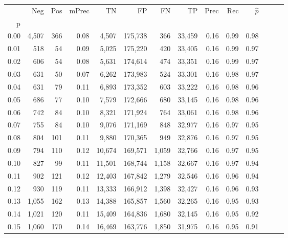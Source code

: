 \begin{tabular}{rrrrrrrrrrrrrr}
\toprule
{} &    Neg &  Pos & mPrec &       TN &       FP &      FN &      TP &  Prec &   Rec & $\hat{p}$ \\
p    &        &      &       &          &          &         &         &       &       &           \\
\midrule
0.00 &  4,507 &  366 &  0.08 &    4,507 &  175,738 &     366 &  33,459 &  0.16 &  0.99 &      0.98 \\
0.01 &    518 &   54 &  0.09 &    5,025 &  175,220 &     420 &  33,405 &  0.16 &  0.99 &      0.97 \\
0.02 &    606 &   54 &  0.08 &    5,631 &  174,614 &     474 &  33,351 &  0.16 &  0.99 &      0.97 \\
0.03 &    631 &   50 &  0.07 &    6,262 &  173,983 &     524 &  33,301 &  0.16 &  0.98 &      0.97 \\
0.04 &    631 &   79 &  0.11 &    6,893 &  173,352 &     603 &  33,222 &  0.16 &  0.98 &      0.96 \\
0.05 &    686 &   77 &  0.10 &    7,579 &  172,666 &     680 &  33,145 &  0.16 &  0.98 &      0.96 \\
0.06 &    742 &   84 &  0.10 &    8,321 &  171,924 &     764 &  33,061 &  0.16 &  0.98 &      0.96 \\
0.07 &    755 &   84 &  0.10 &    9,076 &  171,169 &     848 &  32,977 &  0.16 &  0.97 &      0.95 \\
0.08 &    804 &  101 &  0.11 &    9,880 &  170,365 &     949 &  32,876 &  0.16 &  0.97 &      0.95 \\
0.09 &    794 &  110 &  0.12 &   10,674 &  169,571 &   1,059 &  32,766 &  0.16 &  0.97 &      0.95 \\
0.10 &    827 &   99 &  0.11 &   11,501 &  168,744 &   1,158 &  32,667 &  0.16 &  0.97 &      0.94 \\
0.11 &    902 &  121 &  0.12 &   12,403 &  167,842 &   1,279 &  32,546 &  0.16 &  0.96 &      0.94 \\
0.12 &    930 &  119 &  0.11 &   13,333 &  166,912 &   1,398 &  32,427 &  0.16 &  0.96 &      0.93 \\
0.13 &  1,055 &  162 &  0.13 &   14,388 &  165,857 &   1,560 &  32,265 &  0.16 &  0.95 &      0.93 \\
0.14 &  1,021 &  120 &  0.11 &   15,409 &  164,836 &   1,680 &  32,145 &  0.16 &  0.95 &      0.92 \\
0.15 &  1,060 &  170 &  0.14 &   16,469 &  163,776 &   1,850 &  31,975 &  0.16 &  0.95 &      0.91 \\

\end{tabular}
